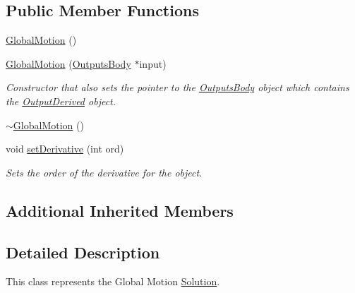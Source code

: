 \subsection*{Public Member Functions}
\begin{DoxyCompactItemize}
\item 
\hyperlink{classosea_1_1ofreq_1_1_global_motion_afe0b801895608782addf27d231bce572}{Global\-Motion} ()
\item 
\hyperlink{classosea_1_1ofreq_1_1_global_motion_ae7155de9b1cb90cbd1d36e7714c1a3ce}{Global\-Motion} (\hyperlink{classosea_1_1ofreq_1_1_outputs_body}{Outputs\-Body} $\ast$input)
\begin{DoxyCompactList}\small\item\em Constructor that also sets the pointer to the \hyperlink{classosea_1_1ofreq_1_1_outputs_body}{Outputs\-Body} object which contains the \hyperlink{classosea_1_1ofreq_1_1_output_derived}{Output\-Derived} object. \end{DoxyCompactList}\item 
\hyperlink{classosea_1_1ofreq_1_1_global_motion_aee21eade3de9cb666a6b8fa42cf1e9e1}{$\sim$\-Global\-Motion} ()
\item 
void \hyperlink{classosea_1_1ofreq_1_1_global_motion_a15a8c0d57ffedf65a1cd84154cdaa6ae}{set\-Derivative} (int ord)
\begin{DoxyCompactList}\small\item\em Sets the order of the derivative for the object. \end{DoxyCompactList}\end{DoxyCompactItemize}
\subsection*{Additional Inherited Members}


\subsection{Detailed Description}
This class represents the Global Motion \hyperlink{classosea_1_1ofreq_1_1_solution}{Solution}. 

